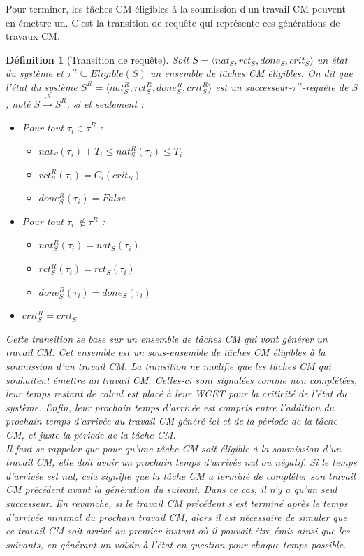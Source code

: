 \documentclass[12pt,a4paper,oneside]{book}
\theoremstyle{break}
\newtheorem{defin}{Définition}[chapter]
\theoremstyle{breakplain}
\begin{document}
Pour terminer, les tâches CM éligibles à la soumission d'un travail CM peuvent en émettre un. C'est la transition de requête qui représente ces générations de travaux CM.\\

\pagebreak

\begin{defin}[Transition de requête]
\label{spo:treq}
Soit $S = \langle nat_S, rct_S, done_S, crit_S \rangle$ un état du système et $\tau^R \subseteq Eligible(S)$ un ensemble de tâches CM éligibles. On dit que l'état du système $S^R = \langle nat_S^R, rct_S^R, done_S^R, crit_S^R \rangle$ est un \textit{successeur-$\tau^R$-requête} de $S$, noté $S\xrightarrow{\tau^R}S^R$, si et seulement :
\begin{itemize}
\item Pour tout $\tau_i \in \tau^R$ :\begin{itemize}
    \item $nat_S(\tau_i)+T_i \leq nat_S^R(\tau_i) \leq T_i$
    \item $rct_S^R(\tau_i)=C_i(crit_S)$
    \item $done_S^R(\tau_i) = False$
\end{itemize}
\item Pour tout $\tau_i\ \notin \tau^R$ :\begin{itemize}
    \item $nat_S^R(\tau_i)=nat_S(\tau_i)$
    \item $rct_S^R(\tau_i)=rct_S(\tau_i)$
    \item $done_S^R(\tau_i) = done_S(\tau_i)$
\end{itemize}
\item $crit_S^R = crit_S$\\
\end{itemize}

Cette transition se base sur un ensemble de tâches CM qui vont générer un travail CM. Cet ensemble est un sous-ensemble de tâches CM éligibles à la soumission d'un travail CM. La transition ne modifie que les tâches CM qui souhaitent émettre un travail CM. Celles-ci sont signalées comme non complétées, leur temps restant de calcul est placé à leur WCET pour la criticité de l'état du système. Enfin, leur prochain temps d'arrivée est compris entre l'addition du prochain temps d'arrivée du travail CM généré ici et de la période de la tâche CM, et juste la période de la tâche CM.\\

Il faut se rappeler que pour qu'une tâche CM soit éligible à la soumission d'un travail CM, elle doit avoir un prochain temps d'arrivée nul ou négatif. Si le temps d'arrivée est nul, cela signifie que la tâche CM a terminé de compléter son travail CM précédent avant la génération du suivant. Dans ce cas, il n'y a qu'un seul successeur. En revanche, si le travail CM précédent s'est terminé après le temps d'arrivée minimal du prochain travail CM, alors il est nécessaire de simuler que ce travail CM soit arrivé au premier instant où il pouvait être émis ainsi que les suivants, en générant un voisin à l'état en question pour chaque temps possible.\\


\end{defin}
\end{document}
